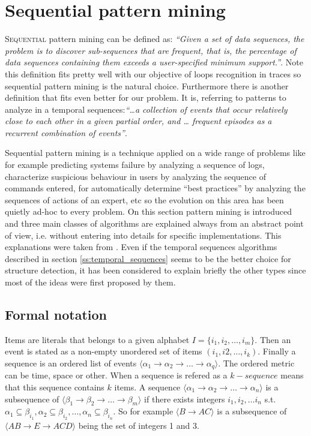 \chapter{Sequential pattern mining}\label{pattern_mining}

\lettrine{S}{equential} pattern mining can be defined as: \textit{``Given a set of data sequences, the
problem is to discover sub-sequences that are frequent, that is, the percentage of
data sequences containing them exceeds a user-specified minimum support.''}. Note 
this definition fits pretty well with our objective of loops recognition in traces 
so sequential pattern mining is the natural choice. Furthermore there is another
definition that fits even better for our problem. It is, referring to patterns to
analyze in a temporal sequences:\textit{``\ldots a collection of events that
occur relatively close to each other in a given partial order, and \ldots
frequent episodes as a recurrent combination of events''}.

Sequential pattern mining is a technique applied on a wide range of problems
like for example predicting systems failure by analyzing a sequence of logs,
characterize suspicious behaviour in users by analyzing the sequence of commands
entered, for automatically determine “best practices” by analyzing the sequences
of actions of an expert, etc so the evolution on this area has been quietly
ad-hoc to every problem. On this section pattern mining is introduced and three
main classes of algorithms are explained always from an abstract point of
view, i.e. without entering into details for specific implementations. This
explanations were taken from \cite{mooney2013sequential}. Even if the temporal
sequences algorithms described in section \ref{ss:temporal_sequences} seems to
be the better choice for structure detection, it has been considered to explain
briefly the other types since most of the ideas were first proposed by them.

\section{Formal notation}\label{ss:formal_notation}

Items are literals that belongs to a given alphabet $I=\{i_{1}, i_{2}, \dots,
i_{m}\}$. Then an event is stated as a non-empty unordered set of items
$(i_{1}, i{2}, \dots, i_{k})$. Finally a sequence is an ordered list of
events $\langle\alpha_{1} \rightarrow \alpha_{2} \rightarrow \dots \rightarrow
\alpha_{q}\rangle$. The ordered metric can be time, space or other. When a
sequence is refered as a $k-sequence$ means that this sequence contains $k$
items. A sequence $\langle\alpha_{1} \rightarrow \alpha_{2} \rightarrow \dots 
\rightarrow \alpha_{n}\rangle$ is a subsequence of $\langle\beta_{1} \rightarrow 
\beta_{2} \rightarrow \dots \rightarrow \beta_{m}\rangle$ if there exists
integers $i_{1}, i_{2}, \dots i_{n}$ s.t. $\alpha_{1} \subseteq \beta_{i_{1}}, 
\alpha_{2} \subseteq \beta_{i_{2}}, \dots, \alpha_{n} \subseteq \beta_{i_{n}}$.
So for example $\langle B \rightarrow AC\rangle$ is a subsequence of 
$\langle AB \rightarrow E \rightarrow ACD \rangle$ being the set of integers 1
and 3.

